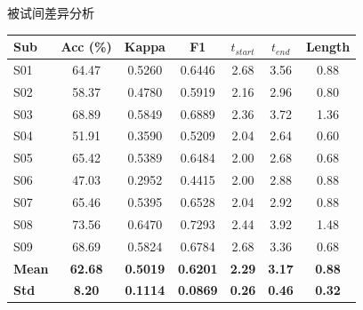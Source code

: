 \begin{frame}{被试间差异分析}
    \centering
    \vspace{-0.5em}
    \begin{table}
        \centering
        \footnotesize
        \begin{tabular}{lcccccc}
            \toprule
            \textbf{Sub} & \textbf{Acc (\%)} & \textbf{Kappa} & \textbf{F1} & \textbf{$t_{start}$} & \textbf{$t_{end}$} & \textbf{Length} \\
            \midrule
            S01 & 64.47 & 0.5260 & 0.6446 & 2.68 & 3.56 & 0.88 \\
            \rowcolor{lightblue}
            S02 & 58.37 & 0.4780 & 0.5919 & 2.16 & 2.96 & 0.80 \\
            S03 & 68.89 & 0.5849 & 0.6889 & 2.36 & 3.72 & 1.36 \\
            \rowcolor{lightblue}
            S04 & 51.91 & 0.3590 & 0.5209 & 2.04 & 2.64 & 0.60 \\
            S05 & 65.42 & 0.5389 & 0.6484 & 2.00 & 2.68 & 0.68 \\
            \rowcolor{lightblue}
            S06 & 47.03 & 0.2952 & 0.4415 & 2.00 & 2.88 & 0.88 \\
            S07 & 65.46 & 0.5395 & 0.6528 & 2.04 & 2.92 & 0.88 \\
            \rowcolor{lightblue}
            S08 & 73.56 & 0.6470 & 0.7293 & 2.44 & 3.92 & 1.48 \\
            S09 & 68.69 & 0.5824 & 0.6784 & 2.68 & 3.36 & 0.68 \\
            \midrule
            \textbf{Mean} & \textbf{62.68} & \textbf{0.5019} & \textbf{0.6201} & \textbf{2.29} & \textbf{3.17} & \textbf{0.88} \\
            \textbf{Std} & \textbf{8.20} & \textbf{0.1114} & \textbf{0.0869} & \textbf{0.26} & \textbf{0.46} & \textbf{0.32} \\
            \bottomrule
        \end{tabular}
    \end{table}

    \vspace{0.3em}


\end{frame}
